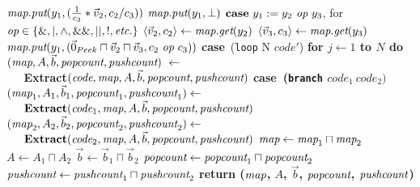 \begin{algorithm}
\begin{algorithmic}
\IND
\STATE $\mbox{\it map}.\mbox{\it put}(y_1, (\frac{1}{c_3}*\vec v_2, c_2/c_3))$
\UND
{}
\IND
\STATE $\mbox{\it map}.\mbox{\it put}(y_1, \bot)$
\UND
\UND
\STATE \vspace{-6pt}
\STATE $\mbox{\bf case}~y_1 := y_2 ~\mbox{\it op}~ y_3$, for $\mbox{\it op} \in \{\&, |, \wedge, \&\&, ||, !, \mbox{\it etc.}\}$
\IND
\STATE $\langle{\vec v_2}, {c_2}\rangle \leftarrow \mbox{\it map}.\mbox{\it get}(y_2)$
\STATE $\langle{\vec v_3}, {c_3}\rangle \leftarrow \mbox{\it map}.\mbox{\it get}(y_3)$
\STATE $\mbox{\it map}.\mbox{\it put}(y_1, (\vec 0_{Peek} \sqcap \vec v_2 \sqcap \vec v_3, c_2 ~\mbox{\it op}~ c_3))$
\UND
\STATE \vspace{-6pt}
\STATE \mbox{\bf case}~({\tt loop} N $code'$)
\IND
\STATE \bf{for} $j \leftarrow 1$ to $N$ {\bf do}
\IND
\STATE $(\mbox{\it map}, A, {\vec b}, \mbox{\it popcount}, \mbox{\it pushcount})~\leftarrow~$ \\
\verb+   +\bf{Extract}$(\mbox{\it code}, \mbox{\it map}, A, {\vec b}, \mbox{\it popcount}, \mbox{\it pushcount})$
\UND
\UND
\STATE \vspace{-6pt}
\STATE \mbox{\bf case}~({\tt branch} $code_1~code_2)$
\IND
\STATE $(\mbox{\it map}_1, A_1, {\vec b_1}, \mbox{\it popcount}_1, \mbox{\it pushcount}_1) \leftarrow$ \\
\verb+   +${\mbox{\bf Extract}}(\mbox{\it code}_1, \mbox{\it map}, A, {\vec b}, \mbox{\it popcount}, \mbox{\it pushcount})$
\STATE $(\mbox{\it map}_2, A_2, {\vec b_2}, \mbox{\it popcount}_2, \mbox{\it pushcount}_2) \leftarrow$ \\ 
\verb+   +${\mbox{\bf Extract}}(\mbox{\it code}_2, \mbox{\it map}, A, {\vec b}, \mbox{\it popcount}, \mbox{\it pushcount})$
\STATE $\mbox{\it map} \leftarrow \mbox{\it map}_1 \sqcap \mbox{\it map}_2$
\STATE $A \leftarrow A_1 \sqcap A_2$
\STATE ${\vec b} \leftarrow {\vec b_1} \sqcap {\vec b_2}$
\STATE $\mbox{\it popcount} \leftarrow \mbox{\it popcount}_1 \sqcap \mbox{\it popcount}_2$
\STATE $\mbox{\it pushcount} \leftarrow \mbox{\it pushcount}_1 \sqcap \mbox{\it pushcount}_2$
\UND
\UND %
\ENDFOR
\STATE return ($\mbox{\it map}$, $A$, ${\vec b}$, $\mbox{\it popcount}$, $\mbox{\it pushcount}$)
\end{algorithmic}
\end{algorithm}
